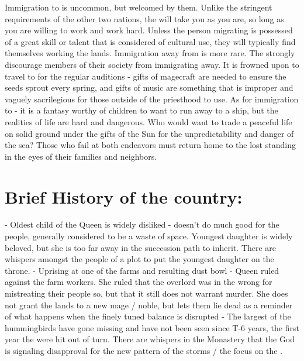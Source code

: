 \documentclass[blue]{GL2020}
\begin{document}
Immigration to \pFarm{} is uncommon, but welcomed by them.  Unlike the stringent requirements of the other two nations, the \pFarm{} will take you as you are, so long as you are willing to work and work hard.  Unless the person migrating is possessed of a great skill or talent that is considered of cultural use, they will typically find themselves working the lands.  Immigration away from \pFarm{} is more rare.  The \pFarmers{} strongly discourage members of their society from immigrating away.  It is frowned upon to travel to \pTech{} for the regular auditions - gifts of magecraft are needed to ensure the seeds sprout every spring, and gifts of music are something that is improper and vaguely sacrilegious for those outside of the priesthood to use.  As for immigration to \pShip{} - it is a fantasy worthy of children to want to run away to a \pShippies{} ship, but the realities of \pShip{} life are hard and dangerous.  Who would want to trade a peaceful life on solid ground under the gifts of the Sun for the unpredictability and danger of the sea?  Those who fail at both endeavors must return home to the lost standing in the eyes of their families and neighbors.


\section*{Brief History of the country:}

 - Oldest child of the Queen is widely disliked - doesn't do much good for the people, generally considered to be a waste of space.  Youngest daughter is widely beloved, but she is too far away in the succession path to inherit.  There are whispers amongst the people of a plot to put the youngest daughter on the throne. %
 - Uprising at one of the farms and resulting dust bowl - Queen ruled against the farm workers.  She ruled that the overlord was in the wrong for mistreating their people so, but that it still does not warrant murder.  She does not grant the lands to a new mage / noble, but lets them lie dead as a reminder of what happens when the finely tuned balance is disrupted
 - The largest of the hummingbirds have gone missing and have not been seen since T-6 years, the first year the \pShip{} were hit out of turn.  There are whispers in the Monastery that the God is signaling disapproval for the new pattern of the storms / the focus on the \pShip{}. %
\end{document}
